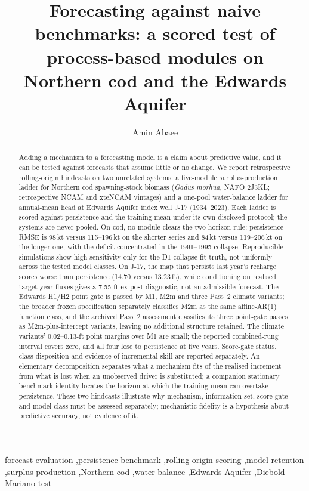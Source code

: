 \documentclass[preprint,11pt,authoryear]{elsarticle}
\theoremstyle{definition}
\theoremstyle{remark}
\begin{document}
\begin{frontmatter}

\title{Forecasting against naive benchmarks: a scored test of process-based modules on Northern cod and the Edwards Aquifer}

\author[1]{Amin Abaee}

\begin{abstract}
Adding a mechanism to a forecasting model is a claim about predictive value, and it can be tested against forecasts that assume little or no change. We report retrospective rolling-origin hindcasts on two unrelated systems: a five-module surplus-production ladder for Northern cod spawning-stock biomass (\emph{Gadus morhua}, NAFO 2J3KL; retrospective NCAM and xteNCAM vintages) and a one-pool water-balance ladder for annual-mean head at Edwards Aquifer index well J-17 (1934--2023). Each ladder is scored against persistence and the training mean under its own disclosed protocol; the systems are never pooled. On cod, no module clears the two-horizon rule: persistence RMSE is 98\,kt versus 115--196\,kt on the shorter series and 84\,kt versus 119--206\,kt on the longer one, with the deficit concentrated in the 1991--1995 collapse. Reproducible simulations show high sensitivity only for the D1 collapse-fit truth, not uniformly across the tested model classes. On J-17, the map that persists last year's recharge scores worse than persistence (14.70 versus 13.23\,ft), while conditioning on realised target-year fluxes gives a 7.55-ft ex-post diagnostic, not an admissible forecast. The Edwards H1/H2 point gate is passed by M1, M2m and three Pass~2 climate variants; the broader frozen specification separately classifies M2m as the same affine-AR(1) function class, and the archived Pass~2 assessment classifies its three point-gate passes as M2m-plus-intercept variants, leaving no additional structure retained. The climate variants' 0.02--0.13-ft point margins over M1 are small; the reported combined-rung interval covers zero, and all four lose to persistence at five years. Score-gate status, class disposition and evidence of incremental skill are reported separately. An elementary decomposition separates what a mechanism fits of the realised increment from what is lost when an unobserved driver is substituted; a companion stationary benchmark identity locates the horizon at which the training mean can overtake persistence. These two hindcasts illustrate why mechanism, information set, score gate and model class must be assessed separately; mechanistic fidelity is a hypothesis about predictive accuracy, not evidence of it.
\end{abstract}

\begin{keyword}
forecast evaluation \sep persistence benchmark \sep rolling-origin scoring \sep model retention \sep surplus production \sep Northern cod \sep water balance \sep Edwards Aquifer \sep Diebold--Mariano test
\end{keyword}

\end{frontmatter}
\end{document}
